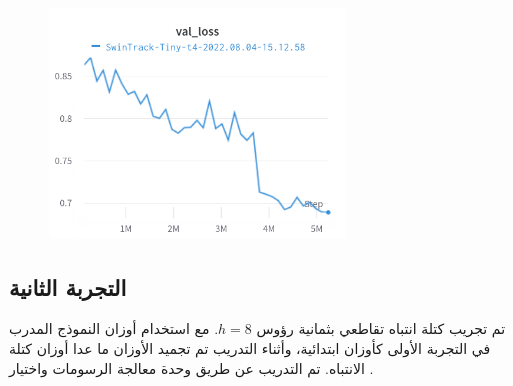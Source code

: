 \begin{figure}[H]
	\centerline{\includegraphics[width=0.7\textwidth]{charts/Section-2-Panel-0-jvrhhrv9d}}
	\caption{
	}
	\label{chart:val_loss}
\end{figure}

\subsection{التجربة الثانية}
تم تجريب كتلة انتباه تقاطعي بثمانية رؤوس
$h = 8$.
مع استخدام أوزان النموذج المدرب في التجربة الأولى كأوزان ابتدائية، وأثناء التدريب تم تجميد الأوزان ما عدا أوزان كتلة الانتباه.
تم التدريب عن طريق وحدة معالجة الرسومات 
واختيار 
.

